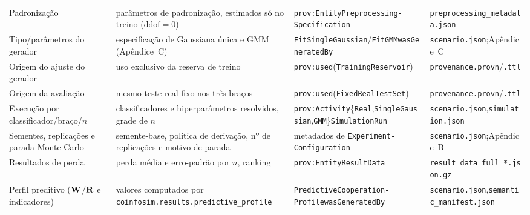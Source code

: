 \begin{footnotesize}
\begin{longtable}{>{\raggedright\arraybackslash}p{2.6cm}>{\raggedright\arraybackslash}p{4.0cm}>{\raggedright\arraybackslash}p{4.4cm}>{\raggedright\arraybackslash}p{3.4cm}}
\addlinespace
Padronização & parâmetros de padronização, estimados só no treino ($\mathrm{ddof}=0$) & \texttt{prov:Entity}\newline\texttt{Preprocessing-}\newline\texttt{Specification} & \texttt{preprocessing\_}\newline\texttt{metadata.json} \\
\addlinespace
Tipo/parâmetros do gerador & especificação de Gaussiana única e GMM (Apêndice~C) & \texttt{FitSingleGaussian}/\newline\texttt{FitGMM}\newline\texttt{wasGeneratedBy} & \texttt{scenario.json};\newline Apêndice~C \\
\addlinespace
Origem do ajuste do gerador & uso exclusivo da reserva de treino & \texttt{prov:used}\newline(\texttt{TrainingReservoir}) & \texttt{provenance.}\newline\texttt{provn}/\texttt{.ttl} \\
\addlinespace
Origem da avaliação & mesmo teste real fixo nos três braços & \texttt{prov:used}\newline(\texttt{FixedRealTestSet}) & \texttt{provenance.}\newline\texttt{provn}/\texttt{.ttl} \\
\addlinespace
Execução por classificador/braço/$n$ & classificadores e hiperparâmetros resolvidos, grade de $n$ & \texttt{prov:Activity}\newline\{\texttt{Real},\texttt{SingleGaussian},\newline\texttt{GMM}\}\texttt{SimulationRun} & \texttt{scenario.json},\newline\texttt{simulation.json} \\
\addlinespace
Sementes, replicações e parada Monte Carlo & semente-base, política de derivação, nº de replicações e motivo de parada & metadados de \texttt{Experiment-}\newline\texttt{Configuration} & \texttt{scenario.json};\newline Apêndice~B \\
\addlinespace
Resultados de perda & perda média e erro-padrão por $n$, ranking & \texttt{prov:Entity}\newline\texttt{ResultData} & \texttt{result\_data\_}\newline\texttt{full\_*.json.gz} \\
\addlinespace
Perfil preditivo ($\mathbf{W}$/$\mathbf{R}$ e indicadores) & valores computados por \texttt{coinfosim.results.}\newline\texttt{predictive\_profile} & \texttt{PredictiveCooperation-}\newline\texttt{Profile}\newline\texttt{wasGeneratedBy} & \texttt{scenario.json},\newline\texttt{semantic\_}\newline\texttt{manifest.json} \\

\end{longtable}
\end{footnotesize}
